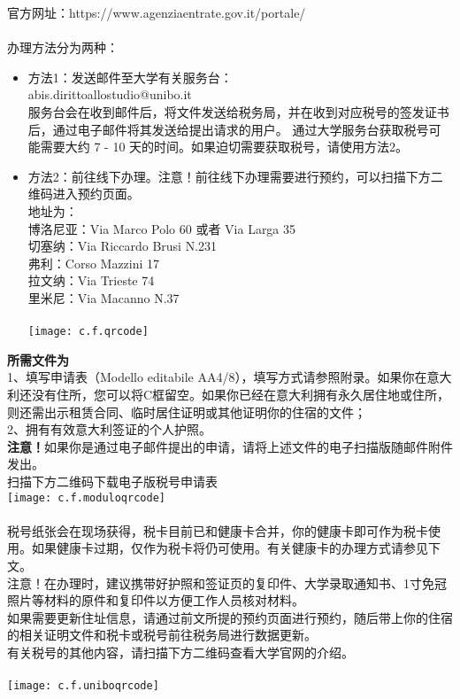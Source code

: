 官方网址：https://www.agenziaentrate.gov.it/portale/\\
\\
办理方法分为两种：
\begin{itemize}
\item 方法1：发送邮件至大学有关服务台：\\
abis.dirittoallostudio@unibo.it\\
服务台会在收到邮件后，将文件发送给税务局，并在收到对应税号的签发证书后，通过电子邮件将其发送给提出请求的用户。
通过大学服务台获取税号可能需要大约 7 - 10 天的时间。如果迫切需要获取税号，请使用方法2。\\
\item 方法2：前往线下办理。注意！前往线下办理需要进行预约，可以扫描下方二维码进入预约页面。\\
地址为：\\
博洛尼亚：Via Marco Polo 60 或者 Via Larga 35\\
切塞纳：Via Riccardo Brusi N.231\\
弗利：Corso Mazzini 17\\
拉文纳：Via Trieste 74\\
里米尼：Via Macanno N.37\\
\\
\texttt{[image: c.f.qrcode]}\\
\end{itemize}
\textbf{所需文件为}\\
1、填写申请表（Modello editabile AA4/8），填写方式请参照附录。如果你在意大利还没有住所，您可以将C框留空。如果你已经在意大利拥有永久居住地或住所，则还需出示租赁合同、临时居住证明或其他证明你的住宿的文件；\\
2、拥有有效意大利签证的个人护照。\\
\textbf{注意！}如果你是通过电子邮件提出的申请，请将上述文件的电子扫描版随邮件附件发出。\\
扫描下方二维码下载电子版税号申请表\\

\texttt{[image: c.f.moduloqrcode]}\\
\\

税号纸张会在现场获得，税卡目前已和健康卡合并，你的健康卡即可作为税卡使用。如果健康卡过期，仅作为税卡将仍可使用。有关健康卡的办理方式请参见下文。\\
注意！在办理时，建议携带好护照和签证页的复印件、大学录取通知书、1寸免冠照片等材料的原件和复印件以方便工作人员核对材料。\\
如果需要更新住址信息，请通过前文所提的预约页面进行预约，随后带上你的住宿的相关证明文件和税卡或税号前往税务局进行数据更新。\\
有关税号的其他内容，请扫描下方二维码查看大学官网的介绍。\\
\\
\texttt{[image: c.f.uniboqrcode]}\\
